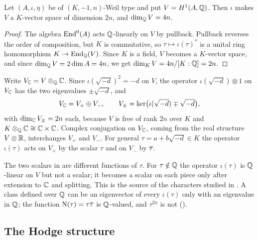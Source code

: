 \begin{lemma}[$H^{1}$ is a $K$-space]\label{lem:Kspace}
Let $(A,\iota,\eta)$ be of $(K,-1,n)$-Weil type and put $V=H^{1}(A,\mathbb{Q})$. Then
$\iota$ makes $V$ a $K$-vector space of dimension $2n$, and
$\dim_{\mathbb{Q}}V=4n$.
\end{lemma}

\begin{proof}
The algebra $\operatorname{End}^{0}(A)$ acts $\mathbb{Q}$-linearly on $V$ by pullback. Pullback
reverses the order of composition, but $K$ is commutative, so
$\tau\mapsto\iota(\tau)^{*}$ is a unital ring homomorphism
$K\to\operatorname{End}_{\mathbb{Q}}(V)$. Since $K$ is a field, $V$ becomes a $K$-vector space,
and since $\dim_{\mathbb{Q}}V=2\dim A=4n$, we get $\dim_{K}V=4n/[K:\mathbb{Q}]=2n$.
\end{proof}

\begin{notation}\label{not:eigen}
Write $V_{\mathbb{C}}=V\otimes_{\mathbb{Q}}\mathbb{C}$. Since $\iota(\sqrt{-d})^{2}=-d$ on $V$,
the operator $\iota(\sqrt{-d})\otimes1$ on $V_{\mathbb{C}}$ has the two
eigenvalues $\pm\sqrt{-d}$, and
\begin{equation}\label{eq:Vsplit}
  V_{\mathbb{C}}=V_{+}\oplus V_{-},
  \qquad
  V_{\pm}=\ker\bigl(\iota(\sqrt{-d})\mp\sqrt{-d}\bigr),
\end{equation}
with $\dim_{\mathbb{C}}V_{\pm}=2n$ each, because $V$ is free of rank $2n$ over $K$ and
$K\otimes_{\mathbb{Q}}\mathbb{C}\cong\mathbb{C}\times\mathbb{C}$. Complex conjugation on $V_{\mathbb{C}}$, coming
from the real structure $V\otimes\mathbb{R}$, interchanges $V_{+}$ and $V_{-}$. For
general $\tau=a+b\sqrt{-d}\in K$ the operator $\iota(\tau)$ acts on $V_{+}$ by
the scalar $\tau$ and on $V_{-}$ by $\overline{\tau}$.
\end{notation}

\begin{remark}\label{rem:tautbar}
The two scalars in  are different functions of $\tau$. For
$\tau\notin\mathbb{Q}$ the operator $\iota(\tau)$ is $\mathbb{Q}$-linear on $V$ but not a
scalar; it becomes a scalar on each piece only after extension to $\mathbb{C}$ and
splitting. This is the source of the characters studied in
. A class defined over $\mathbb{Q}$ can be an eigenvector of
every $\iota(\tau)$ only with an eigenvalue in $\mathbb{Q}$; the function
$\mathrm{N}(\tau)=\tau\overline{\tau}$ is $\mathbb{Q}$-valued, and $\tau^{2n}$ is not
().
\end{remark}

\subsection{The Hodge structure}

